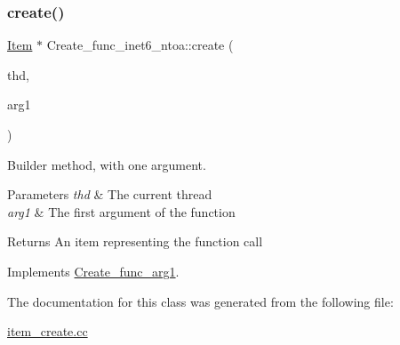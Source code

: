 \subsubsection{\texorpdfstring{create()}{create()}}
{\footnotesize\ttfamily \mbox{\hyperlink{classItem}{Item}} $\ast$ Create\+\_\+func\+\_\+inet6\+\_\+ntoa\+::create (\begin{DoxyParamCaption}\item[{T\+HD $\ast$}]{thd,  }\item[{\mbox{\hyperlink{classItem}{Item}} $\ast$}]{arg1 }\end{DoxyParamCaption})\hspace{0.3cm}{\ttfamily [virtual]}}

Builder method, with one argument. 
\begin{DoxyParams}{Parameters}
{\em thd} & The current thread \\
\hline
{\em arg1} & The first argument of the function \\
\hline
\end{DoxyParams}
\begin{DoxyReturn}{Returns}
An item representing the function call 
\end{DoxyReturn}


Implements \mbox{\hyperlink{classCreate__func__arg1_a3e9a98f755cd82c3e762e334c955a8c9}{Create\+\_\+func\+\_\+arg1}}.



The documentation for this class was generated from the following file\+:\begin{DoxyCompactItemize}
\item 
\mbox{\hyperlink{item__create_8cc}{item\+\_\+create.\+cc}}\end{DoxyCompactItemize}
